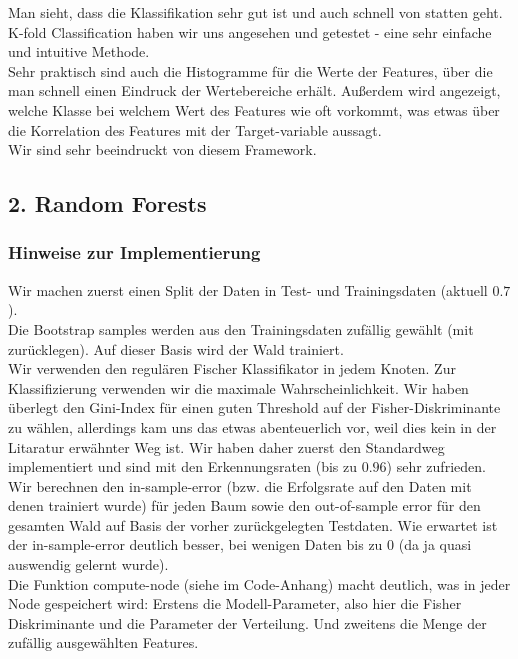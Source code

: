 \documentclass{article}
\begin{document}
Man sieht, dass die Klassifikation sehr gut ist und auch schnell von statten
geht.\\

K-fold Classification haben wir uns angesehen und getestet - eine sehr einfache und intuitive Methode.\\

Sehr praktisch sind auch die Histogramme für die Werte der Features, über die man schnell einen Eindruck der Wertebereiche erhält. Außerdem wird angezeigt, welche Klasse bei welchem Wert des Features wie oft vorkommt, was etwas über die Korrelation des Features mit der Target-variable aussagt.\\

Wir sind sehr beeindruckt von diesem Framework.\\

\subsection*{2. Random Forests}

\subsubsection*{Hinweise zur Implementierung}
Wir machen zuerst einen Split der Daten in Test- und Trainingsdaten (aktuell $0.7$).\\
Die Bootstrap samples werden aus den Trainingsdaten zufällig gewählt (mit zurücklegen). Auf dieser Basis wird der Wald trainiert.\\

Wir verwenden den regulären Fischer Klassifikator in jedem Knoten. Zur Klassifizierung verwenden wir die maximale Wahrscheinlichkeit. Wir haben überlegt den Gini-Index für einen guten Threshold auf der Fisher-Diskriminante zu wählen, allerdings kam uns das etwas abenteuerlich vor, weil dies kein in der Litaratur erwähnter Weg ist. Wir haben daher zuerst den Standardweg implementiert und sind mit den Erkennungsraten (bis zu $0.96$) sehr zufrieden.\\

Wir berechnen den in-sample-error (bzw. die Erfolgsrate auf den Daten mit denen trainiert wurde) für jeden Baum sowie den out-of-sample error für den gesamten Wald auf Basis der vorher zurückgelegten Testdaten. Wie erwartet ist der in-sample-error deutlich besser, bei wenigen Daten bis zu 0 (da ja quasi auswendig gelernt wurde).\\

Die Funktion compute-node (siehe im Code-Anhang) macht deutlich, was in jeder Node gespeichert wird: Erstens die Modell-Parameter, also hier die Fisher Diskriminante und die Parameter der Verteilung. Und zweitens die Menge der zufällig ausgewählten Features.\\
\end{document}
